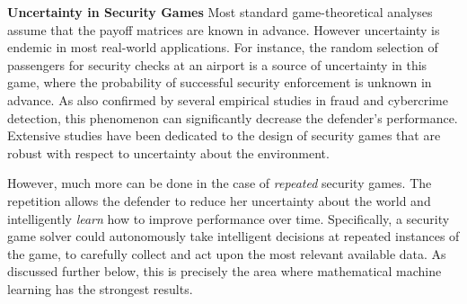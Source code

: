 
\textbf{Uncertainty in Security Games}
Most standard game-theoretical analyses assume that the payoff matrices are known in advance.  However uncertainty is endemic in most real-world applications. 
For instance, the random selection of passengers for security checks at an airport is a source of uncertainty in this game, where  %
the probability of successful security enforcement  is unknown in advance. 
As also confirmed by several empirical studies in fraud and cybercrime detection, this phenomenon can significantly decrease the defender's performance\cite{granick2005faking, swire2009no}.
Extensive studies have been dedicated to the design of security games that are robust with respect to uncertainty about the environment\cite{aghassi2006robust,Nguyen14RO, Kiekintveld:2013}. 

However, much more can be done in the case of {\em repeated} security games.  
The repetition allows the defender to reduce her uncertainty about the world and intelligently {\em learn} how to improve performance over time. Specifically, a security game solver could autonomously take intelligent decisions at repeated instances of the game, to carefully collect and act upon the most relevant available data. As discussed further below, this is precisely the area where mathematical machine learning has the strongest results.



